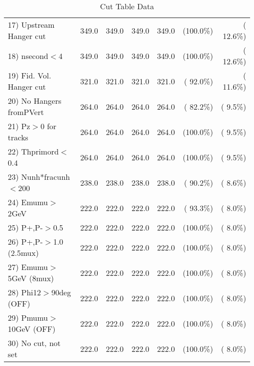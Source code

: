 \begin{table}[h!]
\begin{tabular}{||l||r|r|r|r|r|r||}
 17) Upstream Hanger cut  &        349.0 &        349.0 &        349.0 &        349.0 & (100.0\%) & ( 12.6\%) \\
 18) nsecond$<$4          &        349.0 &        349.0 &        349.0 &        349.0 & (100.0\%) & ( 12.6\%) \\
 19) Fid. Vol. Hanger cut &        321.0 &        321.0 &        321.0 &        321.0 & ( 92.0\%) & ( 11.6\%) \\
 20) No Hangers fromPVert &        264.0 &        264.0 &        264.0 &        264.0 & ( 82.2\%) & (  9.5\%) \\
 21) Pz$>$0 for tracks    &        264.0 &        264.0 &        264.0 &        264.0 & (100.0\%) & (  9.5\%) \\
 22) Thprimord$<$0.4      &        264.0 &        264.0 &        264.0 &        264.0 & (100.0\%) & (  9.5\%) \\
 23) Nunh*fracunh$<$200   &        238.0 &        238.0 &        238.0 &        238.0 & ( 90.2\%) & (  8.6\%) \\
 24) Emumu$>$2GeV         &        222.0 &        222.0 &        222.0 &        222.0 & ( 93.3\%) & (  8.0\%) \\
 25) P+,P-$>$0.5          &        222.0 &        222.0 &        222.0 &        222.0 & (100.0\%) & (  8.0\%) \\
 26) P+,P-$>$1.0 (2.5mux) &        222.0 &        222.0 &        222.0 &        222.0 & (100.0\%) & (  8.0\%) \\
 27) Emumu$>$5GeV  (8mux) &        222.0 &        222.0 &        222.0 &        222.0 & (100.0\%) & (  8.0\%) \\
 28) Phi12$>$90deg  (OFF) &        222.0 &        222.0 &        222.0 &        222.0 & (100.0\%) & (  8.0\%) \\
 29) Pmumu$>$10GeV  (OFF) &        222.0 &        222.0 &        222.0 &        222.0 & (100.0\%) & (  8.0\%) \\
 30) No cut, not set      &        222.0 &        222.0 &        222.0 &        222.0 & (100.0\%) & (  8.0\%) \\
 \hline
 \hline
 \end{tabular}
 \caption{Cut Table  Data     }
 \label{tab-cutcohjpsi-mumu_data}
 \end{table}
